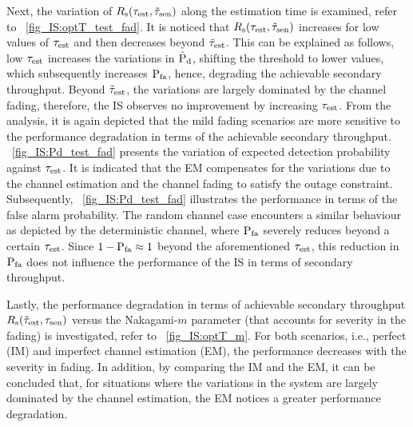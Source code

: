 {Next, the variation of $R_{\text{s}}(\tau_{\text{est}}, \tilde{\tau}_{\text{sen}})$ along the estimation time is examined, refer to \figurename~\ref{fig_IS:optT_test_fad}. It is noticed that $R_{\text{s}}(\tau_{\text{est}}, \tilde{\tau}_{\text{sen}})$ increases for low values of $\tau_{\text{est}}$ and then decreases beyond $\tilde{\tau}_{\text{est}}$. This can be explained as follows, low $\tau_{\text{est}}$ increases the variations in $\hat{\text{P}}_{\text{d}}$, shifting the threshold to lower values, which subsequently increases $\text{P}_{\text{fa}}$, hence, degrading the achievable secondary throughput. Beyond $\tilde{\tau}_{\text{est}}$, the variations are largely dominated by the channel fading, therefore, the IS observes no improvement by increasing $\tau_{\text{est}}$. From the analysis, it is again depicted that the mild fading scenarios are more sensitive to the performance degradation in terms of the achievable secondary throughput. \figurename~\ref{fig_IS:Pd_test_fad} presents the variation of expected detection probability against $\tau_{\text{est}}$. It is indicated that the EM compensates for the variations due to the channel estimation and the channel fading to satisfy the outage constraint. Subsequently, \figurename~\ref{fig_IS:Pd_test_fad} illustrates the performance in terms of the false alarm probability. The random channel case encounters a similar behaviour as depicted by the deterministic channel, where $\text{P}_{\text{fa}}$ severely reduces beyond a certain $\tau_{\text{est}}$. Since $1 - \text{P}_{\text{fa}} \approx 1$ beyond the aforementioned $\tau_{\text{est}}$, this reduction in $\text{P}_{\text{fa}}$ does not influence the performance of the IS in terms of secondary throughput.  

Lastly, the performance degradation in terms of achievable secondary throughput $R_{\text{s}}(\tilde{\tau}_{\text{est}}, \tau_{\text{sen}})$ versus the Nakagami-$m$ parameter (that accounts for severity in the fading) is investigated, refer to \figurename~\ref{fig_IS:optT_m}. For both scenarios, i.e., perfect (IM) and imperfect channel estimation (EM), the performance decreases with the severity in fading. In addition, by comparing the IM and the EM, it can be concluded that, for situations where the variations in the system are largely dominated by the channel estimation, the EM notices a greater performance degradation.


}
